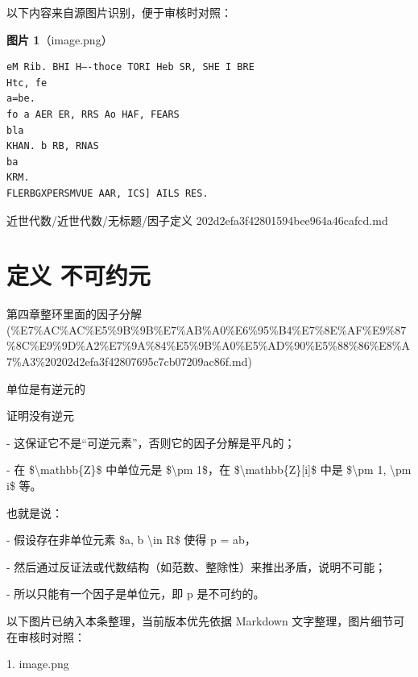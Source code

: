 \begin{note}
以下内容来自源图片识别，便于审核时对照：

\textbf{图片 1}（image.png）
\begin{Verbatim}[fontsize=\small]
eM Rib. BHI H—-thoce TORI Heb SR, SHE I BRE
Htc, fe
a=be.
fo a AER ER, RRS Ao HAF, FEARS
bla
KHAN. b RB, RNAS
ba
KRM.
FLERBGXPERSMVUE AAR, ICS] AILS RES.
\end{Verbatim}

\end{note}

\begin{note}[来源路径]

近世代数/近世代数/无标题/因子定义 202d2efa3f42801594bee964a46cafcd.md

\end{note}

\section*{定义 不可约元}

\begin{note}[来源上级主题]

第四章整环里面的因子分解 (\%E7\%AC\%AC\%E5\%9B\%9B\%E7\%AB\%A0\%E6\%95\%B4\%E7\%8E\%AF\%E9\%87\%8C\%E9\%9D\%A2\%E7\%9A\%84\%E5\%9B\%A0\%E5\%AD\%90\%E5\%88\%86\%E8\%A7\%A3\%20202d2efa3f42807695c7cb07209ac86f.md)

\end{note}

\begin{definition}[定义 不可约元]

单位是有逆元的

证明没有逆元

- 这保证它不是“可逆元素”，否则它的因子分解是平凡的；

- 在 \$\textbackslash{}mathbb\{Z\}\$ 中单位元是 \$\textbackslash{}pm 1\$，在 \$\textbackslash{}mathbb\{Z\}[i]\$ 中是 \$\textbackslash{}pm 1, \textbackslash{}pm i\$ 等。

也就是说：

- 假设存在非单位元素 \$a, b \textbackslash{}in R\$ 使得 p = ab，

- 然后通过反证法或代数结构（如范数、整除性）来推出矛盾，说明不可能；

- 所以只能有一个因子是单位元，即 p 是不可约的。

\end{definition}

\begin{note}[关联图片]
以下图片已纳入本条整理，当前版本优先依据 Markdown 文字整理，图片细节可在审核时对照：

1. image.png\\

\end{note}

